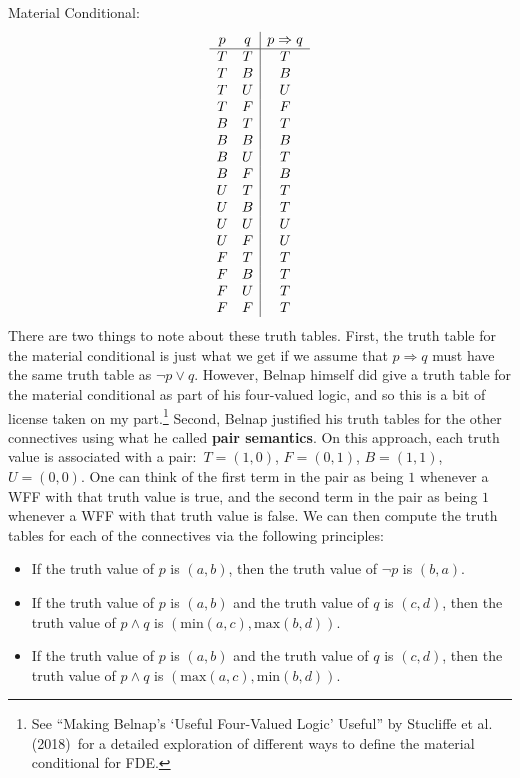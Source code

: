 \documentclass[11pt]{article}
\theoremstyle{definition}
\theoremstyle{remark}
\begin{document}
Material Conditional:
\[
\begin{array}{c c|c}
p & q & p \Rightarrow q \\
\hline
T & T & T \\
T & B & B \\
T & U & U \\
T & F & F \\
B & T & T \\
B & B & B \\
B & U & T \\
B & F & B \\
U & T & T \\
U & B & T \\
U & U & U \\
U & F & U \\
F & T & T \\
F & B & T \\
F & U & T \\
F & F & T \\
\end{array}
\]
There are two things to note about these truth tables. First, the truth table for the material conditional is just what we get if we assume that $p\Rightarrow q$ must have the same truth table as $\neg p \vee q$. However, Belnap himself did give a truth table for the material conditional as part of his four-valued logic, and so this is a bit of license taken on my part.\footnote{See ``Making Belnap’s `Useful Four-Valued Logic' Useful'' by Stucliffe et al. (2018)\ for a detailed exploration of different ways to define the material conditional for FDE.} Second, Belnap justified his truth tables for the other connectives using what he called \textbf{pair semantics}. On this approach, each truth value is associated with a pair:\ $T=(1,0)$, $F=(0,1)$, $B=(1,1)$, $U=(0,0)$. One can think of the first term in the pair as being $1$ whenever a WFF with that truth value is true, and the second term in the pair as being $1$ whenever a WFF with that truth value is false. We can then compute the truth tables for each of the connectives via the following principles:
\begin{itemize}
    \item If the truth value of $p$ is $(a,b)$, then the truth value of $\neg p$ is $(b,a)$.

    \item If the truth value of $p$ is $(a,b)$ and the truth value of $q$ is $(c,d)$, then the truth value of $p\wedge q$ is $(\text{min}(a,c),\text{max}(b,d))$.

    \item If the truth value of $p$ is $(a,b)$ and the truth value of $q$ is $(c,d)$, then the truth value of $p\wedge q$ is $(\text{max}(a,c),\text{min}(b,d))$.
\end{itemize}
\end{document}
